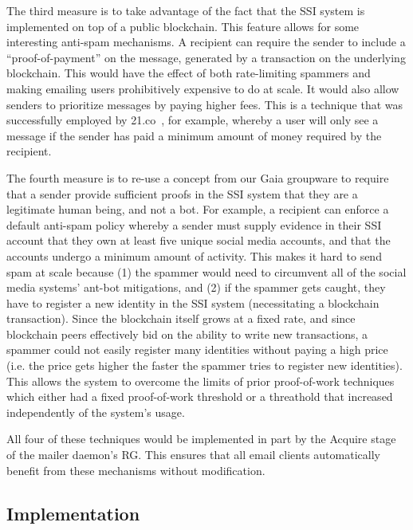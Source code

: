 
The third measure is to take advantage of the fact that the SSI system is implemented on top of
a public blockchain.  This feature allows for some interesting anti-spam mechanisms.  A recipient can require the sender
to include a ``proof-of-payment'' on the message, generated by a transaction on the
underlying blockchain.  This would have the effect of both rate-limiting
spammers and making emailing users prohibitively expensive to do at scale.  It
would also allow senders to prioritize messages by paying higher fees. This
is a technique that was successfully employed by
21.co~\cite{21co-messaging}, for example, whereby a user will only see a
message if the sender has paid a minimum amount of money required by the
recipient.


The fourth measure is to re-use a concept from our Gaia groupware to require
that a sender provide sufficient proofs in the SSI system that they are a
legitimate human being, and not a bot.  For example, a recipient can enforce a
default anti-spam policy whereby a sender must supply evidence in their SSI
account that they own at least five unique social media accounts, and that the
accounts undergo a minimum amount of activity.  This makes it hard to send
spam at scale because (1) the spammer would need to circumvent all of the social
media systems' ant-bot mitigations, and (2) if the spammer gets caught, they
have to register a new identity in the SSI system (necessitating a blockchain
transaction).  Since the blockchain itself grows at a fixed rate, and since
blockchain peers effectively bid on the ability to write new transactions, a
spammer could not easily register many identities without paying a high price
(i.e. the price gets higher the faster the spammer tries to register new
identities).  This allows the system to overcome the limits of prior proof-of-work
techniques~\cite{anti-spam-proof-of-work} which either had a fixed proof-of-work
threshold or a threathold that increased independently of the system's usage.

All four of these techniques would be implemented in part by the Acquire stage of the
mailer daemon's RG.  This ensures that all email clients automatically benefit
from these mechanisms without modification.

\subsection{Implementation}

